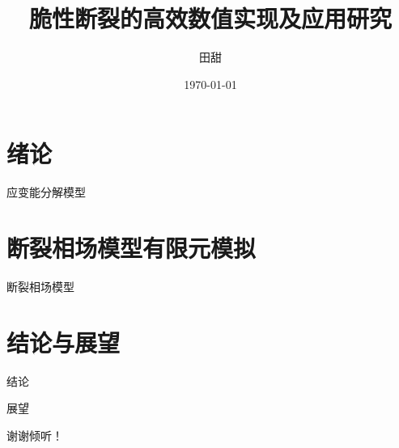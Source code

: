 \documentclass{beamer}
\title{脆性断裂的高效数值实现及应用研究}
\author{田甜}
\institute[XTU]{
导师：魏华祎\\
\vspace{5pt}
湘潭大学$\bullet$数学与计算科学学院\\
}
\date[XTU]
{
    \today
}
\numberwithin{subsection}{section}
\begin{document}
\begin{frame}
  \titlepage
\end{frame}

\section{绪论}



\begin{frame}{应变能分解模型}

\end{frame}

\section{断裂相场模型有限元模拟}
\begin{frame}{断裂相场模型}

\end{frame}



\section{结论与展望}
\begin{frame}{结论}


\end{frame}

\begin{frame}{展望}

\end{frame}


\begin{frame}
    \huge\centering
    谢谢倾听！
\end{frame}


\end{document}
